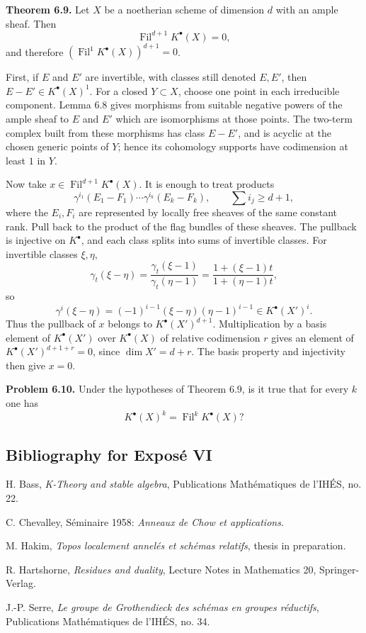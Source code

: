 \documentclass[11pt]{article}
\newcommand{\Fil}{\operatorname{Fil}}
\begin{document}
\textbf{Theorem 6.9.} Let \(X\) be a noetherian scheme of dimension \(d\) with an ample sheaf. Then
\[
  \Fil^{d+1}K^\bullet(X)=0,
\]
and therefore \((\Fil^1K^\bullet(X))^{d+1}=0\).

First, if \(E\) and \(E'\) are invertible, with classes still denoted \(E,E'\), then \(E-E'\in K^\bullet(X)^1\). For a closed \(Y\subset X\), choose one point in each irreducible component. Lemma 6.8 gives morphisms from suitable negative powers of the ample sheaf to \(E\) and \(E'\) which are isomorphisms at those points. The two-term complex built from these morphisms has class \(E-E'\), and is acyclic at the chosen generic points of \(Y\); hence its cohomology supports have codimension at least \(1\) in \(Y\).

Now take \(x\in \Fil^{d+1}K^\bullet(X)\). It is enough to treat products
\[
  \gamma^{i_1}(E_1-F_1)\cdots\gamma^{i_k}(E_k-F_k),
  \qquad \sum i_j\geq d+1,
\]
where the \(E_i,F_i\) are represented by locally free sheaves of the same constant rank. Pull back to the product of the flag bundles of these sheaves. The pullback is injective on \(K^\bullet\), and each class splits into sums of invertible classes. For invertible classes \(\xi,\eta\),
\[
  \gamma_t(\xi-\eta)
  =\frac{\gamma_t(\xi-1)}{\gamma_t(\eta-1)}
  =\frac{1+(\xi-1)t}{1+(\eta-1)t},
\]
so
\[
  \gamma^i(\xi-\eta)=(-1)^{i-1}(\xi-\eta)(\eta-1)^{i-1}\in K^\bullet(X')^i.
\]
Thus the pullback of \(x\) belongs to \(K^\bullet(X')^{d+1}\). Multiplication by a basis element of \(K^\bullet(X')\) over \(K^\bullet(X)\) of relative codimension \(r\) gives an element of \(K^\bullet(X')^{d+1+r}=0\), since \(\dim X'=d+r\). The basis property and injectivity then give \(x=0\).

\textbf{Problem 6.10.} Under the hypotheses of Theorem 6.9, is it true that for every \(k\) one has
\[
  K^\bullet(X)^k=\Fil^kK^\bullet(X)?
\]

\subsection*{Bibliography for Exposé VI}
\begin{enumerate}[label={\textup{[\arabic*]}}]
\item H. Bass, \emph{K-Theory and stable algebra}, Publications Mathématiques de l'IHÉS, no. 22.
\item C. Chevalley, Séminaire 1958: \emph{Anneaux de Chow et applications}.
\item M. Hakim, \emph{Topos localement annelés et schémas relatifs}, thesis in preparation.
\item R. Hartshorne, \emph{Residues and duality}, Lecture Notes in Mathematics 20, Springer-Verlag.
\item J.-P. Serre, \emph{Le groupe de Grothendieck des schémas en groupes réductifs}, Publications Mathématiques de l'IHÉS, no. 34.
\end{enumerate}
\end{document}
